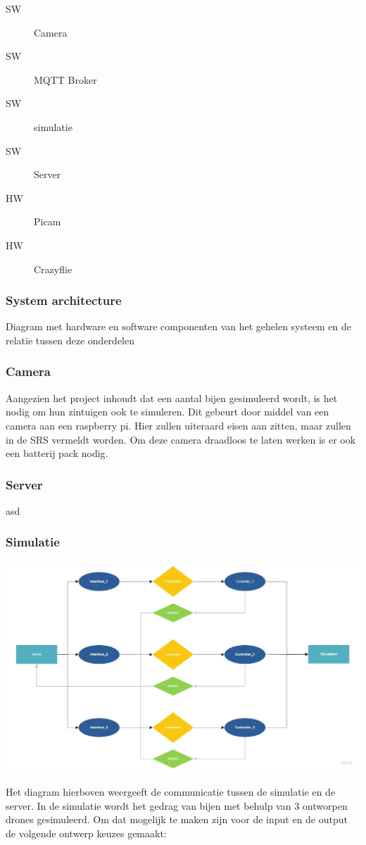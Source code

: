 \begin{description}
    \item[SW] Camera
    \item[SW] MQTT Broker
    \item[SW] simulatie
    \item[SW] Server
    \item[HW] Picam
    \item[HW] Crazyflie
\end{description}

\subsubsection{System architecture}
Diagram met hardware en software componenten van het gehelen systeem en de relatie tussen deze onderdelen
\subsubsection*{Camera}
Aangezien het project inhoudt dat een aantal bijen gesimuleerd wordt, is het nodig om hun zintuigen ook te simuleren. Dit gebeurt door middel van een camera aan een raspberry pi. Hier zullen uiteraard eisen aan zitten, maar zullen in de SRS vermeldt worden. Om deze camera draadloos te laten werken is er ook een batterij pack nodig.

\subsubsection*{Server}
asd
\newline

\subsubsection*{Simulatie}
    \begin{center}
    \hspace*{-3.5cm}\includegraphics[width=1.6\textwidth]{../IMAGES/Simulation Interaction.jpg}
    \end{center}
    Het diagram hierboven weergeeft de communicatie tussen de simulatie en de server. In de simulatie
    wordt het gedrag van bijen met behulp van 3 ontworpen drones gesimuleerd. Om dat mogelijk te maken
    zijn voor de input en de output de volgende ontwerp keuzes gemaakt: \\

